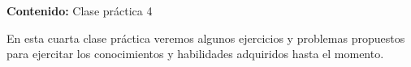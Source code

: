 {\Large
    \textbf{Contenido:} Clase práctica 4
}

En esta cuarta clase práctica veremos algunos ejercicios y problemas propuestos para ejercitar los conocimientos y habilidades adquiridos hasta el momento.
